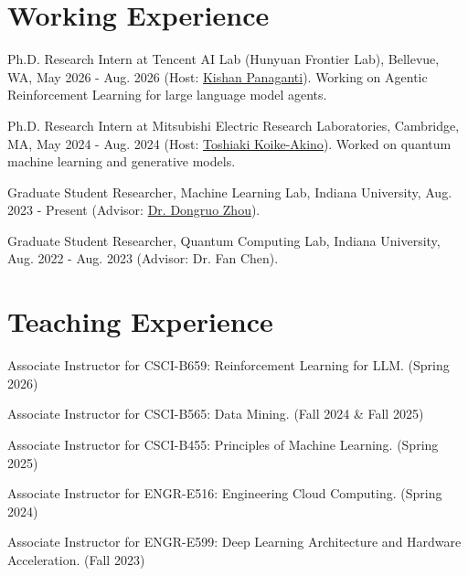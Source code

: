 \documentclass[letterpaper,10.8pt]{article}
\begin{document}
\section{Working Experience}
\begin{description}[font=$\bullet$]
\item Ph.D. Research Intern at Tencent AI Lab (Hunyuan Frontier Lab), Bellevue, WA, May 2026 - Aug. 2026 (Host: \href{https://sites.google.com/a/tamu.edu/kpb/home}{Kishan Panaganti}). Working on Agentic Reinforcement Learning for large language model agents.
\item Ph.D. Research Intern at Mitsubishi Electric Research Laboratories, Cambridge, MA, May 2024 - Aug. 2024 (Host: \href{https://scholar.google.com/citations?user=ZMo2ZM0AAAAJ&hl=en}{Toshiaki Koike-Akino}). Worked on quantum machine learning and generative models.
\item Graduate Student Researcher, Machine Learning Lab, Indiana University, Aug. 2023 - Present (Advisor: \href{https://sites.google.com/view/drzhou}{Dr. Dongruo Zhou}).
\item Graduate Student Researcher, Quantum Computing Lab, Indiana University, Aug. 2022 - Aug. 2023 (Advisor: Dr. Fan Chen).
\end{description}

\section{Teaching Experience}
\begin{description}[font=$\bullet$]
\item Associate Instructor for CSCI-B659: Reinforcement Learning for LLM. (Spring 2026)
\item Associate Instructor for CSCI-B565: Data Mining. (Fall 2024 \& Fall 2025)
\item Associate Instructor for CSCI-B455: Principles of Machine Learning. (Spring 2025)
\item Associate Instructor for ENGR-E516: Engineering Cloud Computing. (Spring 2024)
\item Associate Instructor for ENGR-E599: Deep Learning Architecture and Hardware Acceleration. (Fall 2023)
\end{description}
\end{document}
